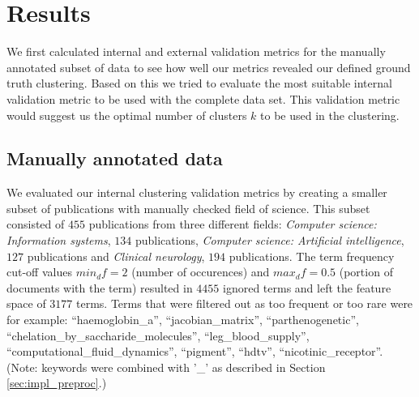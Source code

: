 \chapter{Results}
\label{chapter:results}

We first calculated internal and external validation metrics for 
the manually annotated subset of data to see how well our metrics 
revealed our defined ground truth clustering. Based on this we tried 
to evaluate the most suitable internal validation metric to be used 
with the complete data set. This validation metric would suggest us
the optimal number of clusters $k$ to be used in the clustering.

\section{Manually annotated data}
We evaluated our internal clustering validation metrics by 
creating a smaller subset of publications with manually
checked field of science. This subset consisted of 
$455$ publications from three different fields:
\emph{Computer science: Information systems}, $134$ publications,
\emph{Computer science: Artificial intelligence}, $127$ publications
and \emph{Clinical neurology}, $194$ publications.
The term frequency cut-off values $min_df=2$ (number of occurences) 
and $max_df=0.5$ (portion of documents with the term) resulted
in $4455$ ignored terms and left the feature space of $3177$ terms. 
Terms that were filtered out as too frequent or too rare were for 
example: 
``haemoglobin\_a'', ``jacobian\_matrix'', 
``parthenogenetic'', ``chelation\_by\_saccharide\_molecules'', 
``leg\_blood\_supply'', ``computational\_fluid\_dynamics'', 
``pigment'', ``hdtv'', ``nicotinic\_receptor''. 
\linebreak
(Note: keywords were
combined with '\_' as described in Section \ref{sec:impl_preproc}.)


